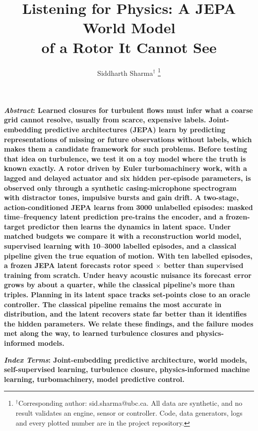 \documentclass[10pt,journal]{IEEEtran}
\begin{document}
\title{Listening for Physics: A JEPA World Model\\of a Rotor It Cannot See}
\author{Siddharth Sharma$^{\dagger}$%
\thanks{$^{\dagger}$Corresponding author: sid.sharma@ubc.ca. All data are synthetic, and no result validates an engine, sensor or controller. Code, data generators, logs and every plotted number are in the project repository.}}
\maketitle

{\noindent\bfseries\small\textit{Abstract}: Learned closures for turbulent flows must infer what a coarse grid cannot resolve, usually from scarce, expensive labels. Joint-embedding predictive architectures (JEPA) learn by predicting representations of missing or future observations without labels, which makes them a candidate framework for such problems. Before testing that idea on turbulence, we test it on a toy model where the truth is known exactly. A rotor driven by Euler turbomachinery work, with a lagged and delayed actuator and six hidden per-episode parameters, is observed only through a synthetic casing-microphone spectrogram with distractor tones, impulsive bursts and gain drift. A two-stage, action-conditioned JEPA learns from 3000 unlabelled episodes: masked time--frequency latent prediction pre-trains the encoder, and a frozen-target predictor then learns the dynamics in latent space. Under matched budgets we compare it with a reconstruction world model, supervised learning with 10--3000 labelled episodes, and a classical pipeline given the true equation of motion. With ten labelled episodes, a frozen JEPA latent forecasts rotor speed \nLabelRatioTen$\times$ better than supervised training from scratch. Under heavy acoustic nuisance its forecast error grows by about a quarter, while the classical pipeline's more than triples. Planning in its latent space tracks set-points close to an oracle controller. The classical pipeline remains the most accurate in distribution, and the latent recovers state far better than it identifies the hidden parameters. We relate these findings, and the failure modes met along the way, to learned turbulence closures and physics-informed models.\par}
\medskip

{\noindent\bfseries\small\textit{Index Terms}: Joint-embedding predictive architecture, world models, self-supervised learning, turbulence closure, physics-informed machine learning, turbomachinery, model predictive control.\par}
\medskip
\end{document}

